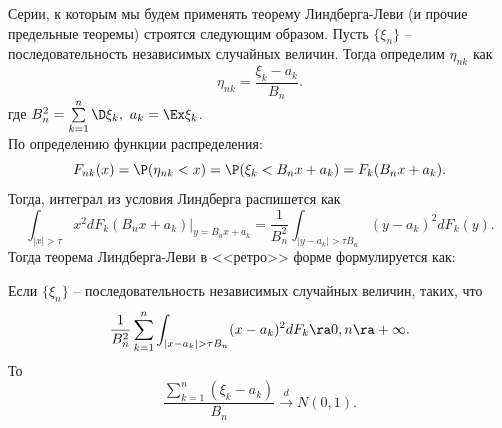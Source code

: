 \begin{note}
    Серии, к которым мы будем применять теорему Линдберга-Леви (и прочие предельные теоремы) строятся следующим образом.
    Пусть $\{\xi_n\}$ -- последовательность независимых случайных величин.
    Тогда определим $\eta_{nk}$ как
    \[
        \eta_{nk} = \dfrac{\xi_k - a_k}{B_n}.
    \]
    где $B_n^2 = \sum\limits_{k = 1}^{n} \D \xi_k, \ a_k = \Ex\xi_k$. \\
    По определению функции распределения:
    \[
        F_{nk}(x) = \P(\eta_{nk} < x) = \P(\xi_k < B_n x + a_k) = F_{k}(B_n x + a_k).
    \]
    Тогда, интеграл из условия Линдберга распишется как
    \[
        \int_{|x| > \tau} x^2 dF_{k}(B_n x + a_k)\biggr|_{y = B_n x + a_k} = \dfrac{1}{B_n^2} \int_{|y - a_k| > \tau B_n} (y - a_k)^2 dF_k(y).
    \]
    Тогда теорема Линдберга-Леви в <<ретро>> форме формулируется как:
    \begin{theorem}
        Если $\{\xi_n\}$ -- последовательность независимых случайных величин, таких, что
        \[
            \dfrac{1}{B_n^2}\sum\limits_{k = 1}^{n} \int_{|x - a_k| > \tau B_n} (x - a_k)^{2}dF_k  \ra 0, n \ra +\infty.
        \]
        То 
        \[
            \dfrac{\sum_{k = 1}^n (\xi_k - a_k)}{B_n} \xrightarrow{d} N(0, 1).
        \]
    \end{theorem}
\end{note}

